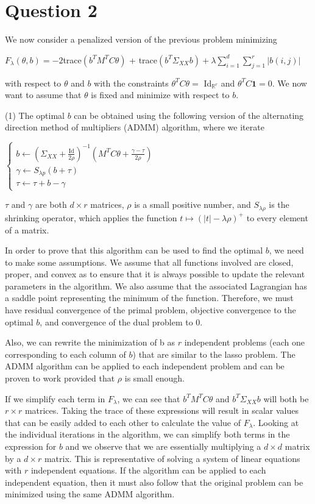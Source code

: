 \section*{Question 2}
We now consider a penalized version of the previous problem minimizing
\begin{center}
    $F_{\lambda}(\theta, b) = -2$trace$(b^{T}M^{T}C\theta)$ + trace$(b^{T}\Sigma_{XX}b) + \lambda\sum\limits_{i=1}^d\sum\limits_{j=1}^r |b(i, j)|$
\end{center}
with respect to $\theta$ and $b$ with the constraints $\theta^{T}C\theta =$ Id$_{\mathbb{R}^{r}}$ and $\theta^{T}C\textbf{1} = 0$. We now want to assume that $\theta$ is fixed and minimize with respect to $b$.

(1) The optimal $b$ can be obtained using the following version of the alternating direction method of multipliers (ADMM) algorithm, where we iterate
\begin{center}
    $\begin{cases}
    b \leftarrow (\Sigma_{XX} + \frac{\text{Id}}{2\rho})^{-1}(M^{T}C\theta + \frac{\gamma - \tau}{2\rho}) \\
    \gamma \leftarrow S_{\lambda p}(b + \tau) \\
    \tau \leftarrow \tau + b - \gamma
    \end{cases}$
\end{center}
$\tau$ and $\gamma$ are both $d \times r$ matrices, $\rho$ is a small positive number, and $S_{\lambda\rho}$ is the shrinking operator, which applies the function $t \mapsto (|t| - \lambda\rho)^{+}$ to every element of a matrix.

In order to prove that this algorithm can be used to find the optimal $b$, we need to make some assumptions. We assume that all functions involved are closed, proper, and convex as to ensure that it is always possible to update the relevant parameters in the algorithm. We also assume that the associated Lagrangian has a saddle point representing the minimum of the function. Therefore, we must have residual convergence of the primal problem, objective convergence to the optimal $b$, and convergence of the dual problem to 0.

Also, we can rewrite the minimization of b as $r$ independent problems (each one corresponding to each column of $b$) that are similar to the lasso problem. The ADMM algorithm can be applied to each independent problem and can be proven to work provided that $\rho$ is small enough.

If we simplify each term in $F_{\lambda}$, we can see that $b^{T}M^{T}C\theta$ and $b^{T}\Sigma_{XX}b$ will both be $r \times r$ matrices. Taking the trace of these expressions will result in scalar values that can be easily added to each other to calculate the value of $F_{\lambda}$. Looking at the individual iterations in the algorithm, we can simplify both terms in the expression for $b$ and we observe that we are essentially multiplying a $d \times d$ matrix by a $d \times r$ matrix. This is representative of solving a system of linear equations with $r$ independent equations. If the algorithm can be applied to each independent equation, then it must also follow that the original problem can be minimized using the same ADMM algorithm.

